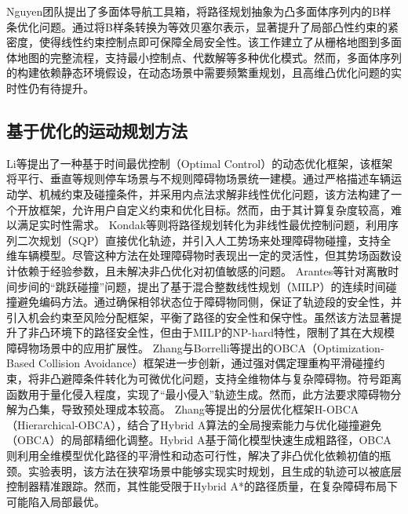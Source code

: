 \documentclass[master,academic]{ysuthesis} %
\begin{document}
		Nguyen团队提出了多面体导航工具箱，将路径规划抽象为凸多面体序列内的B样条优化问题。通过将B样条转换为等效贝塞尔表示，显著提升了局部凸性约束的紧密度，使得线性约束控制点即可保障全局安全性。该工作建立了从栅格地图到多面体地图的完整流程，支持最小控制点、代数解等多种优化模式。然而，多面体序列的构建依赖静态环境假设，在动态场景中需要频繁重规划，且高维凸优化问题的实时性仍有待提升。
		

		\subsection{基于优化的运动规划方法}
		Li等提出了一种基于时间最优控制（Optimal Control）的动态优化框架，该框架将平行、垂直等规则停车场景与不规则障碍物场景统一建模。通过严格描述车辆运动学、机械约束及碰撞条件，并采用内点法求解非线性优化问题，该方法构建了一个开放框架，允许用户自定义约束和优化目标。然而，由于其计算复杂度较高，难以满足实时性需求。
		Kondak等则将路径规划转化为非线性最优控制问题，利用序列二次规划（SQP）直接优化轨迹，并引入人工势场来处理障碍物碰撞，支持全维车辆模型。尽管这种方法在处理障碍物时表现出一定的灵活性，但其势场函数设计依赖于经验参数，且未解决非凸优化对初值敏感的问题。
		Arantes等针对离散时间步间的“跳跃碰撞”问题，提出了基于混合整数线性规划（MILP）的连续时间碰撞避免编码方法。通过确保相邻状态位于障碍物同侧，保证了轨迹段的安全性，并引入机会约束至风险分配框架，平衡了路径的安全性和保守性。虽然该方法显著提升了非凸环境下的路径安全性，但由于MILP的NP-hard特性，限制了其在大规模障碍物场景中的应用扩展性。
		Zhang与Borrelli等提出的OBCA（Optimization-Based Collision Avoidance）框架进一步创新，通过强对偶定理重构平滑碰撞约束，将非凸避障条件转化为可微优化问题，支持全维物体与复杂障碍物。符号距离函数用于量化侵入程度，实现了“最小侵入”轨迹生成。然而，此方法要求障碍物分解为凸集，导致预处理成本较高。
		Zhang等提出的分层优化框架H-OBCA（Hierarchical-OBCA），结合了Hybrid A算法的全局搜索能力与优化碰撞避免（OBCA）的局部精细化调整。Hybrid A基于简化模型快速生成粗路径，OBCA则利用全维模型优化路径的平滑性和动态可行性，解决了非凸优化依赖初值的瓶颈。实验表明，该方法在狭窄场景中能够实现实时规划，且生成的轨迹可以被底层控制器精准跟踪。然而，其性能受限于Hybrid A*的路径质量，在复杂障碍布局下可能陷入局部最优。
\end{document}
